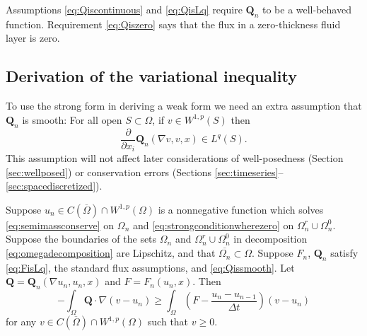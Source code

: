 \documentclass[final,onefignum]{siamart190516}
\newcommand\bQ{\mathbf{Q}}
\newcommand{\grad}{\nabla}
\begin{document}
Assumptions \eqref{eq:Qiscontinuous} and \eqref{eq:QisLq} require $\bQ_n$ to be a well-behaved function.  Requirement \eqref{eq:Qiszero} says that the flux in a zero-thickness fluid layer is zero.

\subsection{Derivation of the variational inequality}  \label{subsec:derivevi}  To use the strong form in deriving a weak form we need an extra assumption that $\bQ_n$ is smooth:  For all open $S \subset \Omega$, if $v\in W^{1,p}(S)$ then
\begin{equation}
\frac{\partial}{\partial x_i} \bQ_n(\grad v,v,x) \in L^q(S). \label{eq:Qissmooth}
\end{equation}
This assumption will not affect later considerations of well-posedness (Section \ref{sec:wellposed}) or conservation errors (Sections \ref{sec:timeseries}--\ref{sec:spacediscretized}).

\begin{theorem} \label{thm:strongimpliesweak}  Suppose $u_n \in C(\overline{\Omega}) \cap W^{1,p}(\Omega)$ is a nonnegative function which solves \eqref{eq:semimassconserve} on $\Omega_n$ and \eqref{eq:strongconditionwherezero} on $\Omega_n^r \cup \Omega_n^0$.  Suppose the boundaries of the sets $\Omega_n$ and $\Omega_n^r \cup \Omega_n^0$ in decomposition \eqref{eq:omegadecomposition} are Lipschitz, and that $\overline{\Omega_n} \subset \Omega$.  Suppose $F_n$, $\bQ_n$ satisfy \eqref{eq:FisLq}, the standard flux assumptions, and \eqref{eq:Qissmooth}.  Let $\bQ = \bQ_n(\grad u_n,u_n,x)$ and $F=F_n(u_n,x)$.  Then
\begin{equation}
-\int_{\Omega} \bQ \cdot \grad(v-u_n) \ge \int_{\Omega} \left(F - \frac{u_n - u_{n-1}}{\Delta t}\right) (v-u_n) \label{eq:morallytheVI}
\end{equation}
for any $v \in C(\overline{\Omega}) \cap W^{1,p}(\Omega)$ such that $v \ge 0$.
\end{theorem}
\end{document}
